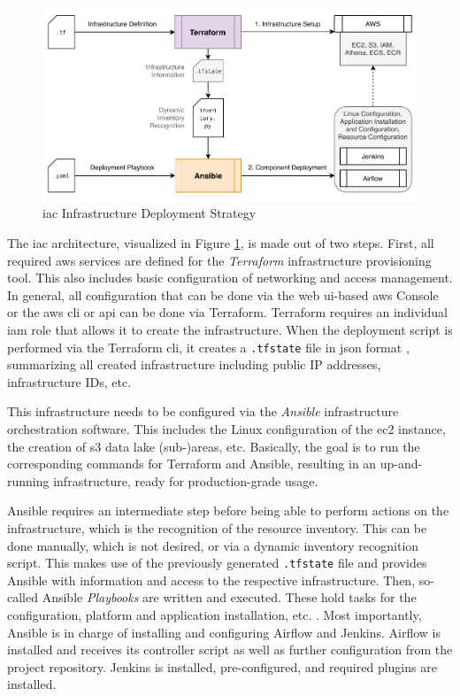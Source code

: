 \begin{figure}[h!]
	\centering
	\includegraphics[width=\linewidth]{main-matter/img/5-iac}
	\caption{\acs{iac} Infrastructure Deployment Strategy}
	\label{fig:5-iac}
\end{figure}

The \ac{iac} architecture, visualized in Figure \ref{fig:5-iac}, is made out of two steps. First, all required \ac{aws} services are defined for the \textit{Terraform} infrastructure provisioning tool. This also includes basic configuration of networking and access management. In general, all configuration that can be done via the web \acs{ui}-based \ac{aws} Console or the \ac{aws} \acs{cli} or \acs{api} can be done via Terraform. Terraform requires an individual \ac{iam} role that allows it to create the infrastructure. When the deployment script is performed via the Terraform \acs{cli}, it creates a \texttt{.tfstate} file in \ac{json} format \cite{terraform}, summarizing all created infrastructure including public IP addresses, infrastructure IDs, etc.

This infrastructure needs to be configured via the \textit{Ansible} infrastructure orchestration software. This includes the Linux configuration of the \ac{ec2} instance, the creation of \ac{s3} data lake (sub-)areas, etc. Basically, the goal is to run the corresponding commands for Terraform and Ansible, resulting in an up-and-running infrastructure, ready for production-grade usage.

Ansible requires an intermediate step before being able to perform actions on the infrastructure, which is the recognition of the resource inventory. This can be done manually, which is not desired, or via a dynamic inventory recognition script. This makes use of the previously generated \texttt{.tfstate} file and provides Ansible with information and access to the respective infrastructure. Then, so-called Ansible \textit{Playbooks} are written and executed. These hold tasks for the configuration, platform and application installation, etc. \cite{ansible}. Most importantly, Ansible is in charge of installing and configuring Airflow and Jenkins. Airflow is installed and receives its controller script as well as further configuration from the project repository. Jenkins is installed, pre-configured, and required plugins are installed. 


